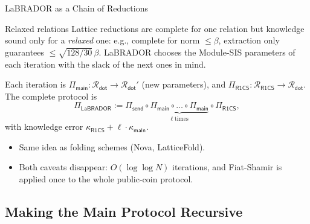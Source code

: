 \documentclass{zkdl-presentation-template}
\begin{document}
    \begin{frame}{LaBRADOR as a Chain of Reductions}
        \begin{remarkblock}{Relaxed relations}
            Lattice reductions are complete for one relation but knowledge sound only for a \emph{relaxed} one: e.g., complete for norm $\leq \beta$, extraction only guarantees $\leq \sqrt{128/30}\,\beta$. LaBRADOR chooses the Module-SIS parameters of each iteration with the slack of the next ones in mind.
        \end{remarkblock}
        \pause

        Each iteration is $\Pi_{\mathsf{main}}: \mathcal{R}_{\mathsf{dot}} \to \mathcal{R}_{\mathsf{dot}}'$ (new parameters), and $\Pi_{\mathsf{R1CS}}: \mathcal{R}_{\mathsf{R1CS}} \to \mathcal{R}_{\mathsf{dot}}$. The complete protocol is
        \begin{equation*}
            \Pi_{\mathsf{LaBRADOR}} := \Pi_{\mathsf{send}} \circ \underbrace{\Pi_{\mathsf{main}} \circ \dots \circ \Pi_{\mathsf{main}}}_{\ell \; \text{times}} \circ \Pi_{\mathsf{R1CS}},
        \end{equation*}
        with knowledge error $\kappa_{\mathsf{R1CS}} + \ell \cdot \kappa_{\mathsf{main}}$.
        \pause

        \begin{itemize}
            \item Same idea as folding schemes (Nova, LatticeFold).
            \item Both caveats disappear: $O(\log\log N)$ iterations, and Fiat-Shamir is applied once to the whole public-coin protocol.
        \end{itemize}
    \end{frame}

    \subsection{Making the Main Protocol Recursive}
\end{document}

